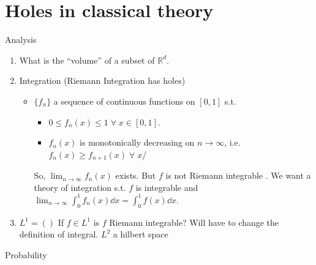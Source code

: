 
\def\npart {II}
\def\nterm {Michaelmas}
\def\nyear {2023}
\def\nlecturer {Dr Sarkar}
\def\ncourse {Probability and Measure}


\usepackage{relsize}

\newcommand{\symmdiff}{\mathrel{\raisebox{1pt}{\( \mathsmaller\triangle \)}}}
\newcommand{\prob}[1]{\mathbb{P}\left({#1}\right)}
\let \emptyset \varnothing

\setcounter{section}{-1}


    \maketitle
    \tableofcontents

    \section{Holes in classical theory}

    Analysis

    \begin{enumerate}
        \item What is the ``volume'' of a subset of $\mathbb{R}^d$.
        \item Integration (Riemann Integration has holes)
        \begin{itemize}
            \item $\{f_n\}$ a sequence of continuous functions on $[0, 1]$ s.t.
            \begin{itemize}
                \item $0 \leq f_n(x) \leq 1 \; \forall \; x \in [0, 1]$.
                \item $f_n(x)$ is monotonically decreasing on $n \to \infty$, i.e. $f_n(x) \geq f_{n+1}(x) \; \forall \; x$/
            \end{itemize}
            So, $\lim_{n \to \infty} f_n(x)$ exists. But $f$ is not Riemann integrable . We want a theory of integration s.t. $f$ is integrable and $\lim_{n \to \infty} \int_{0}^{1} f_n(x) \dd{x} = \int_{0}^{1} f(x) \dd{x}$.
        \end{itemize}
        \item $L^1 = ()$
        If $f \in L^1$ is $f$ Riemann integrable? Will have to change the definition of integral. $L^2$ a hilbert space
    \end{enumerate}

    Probability

